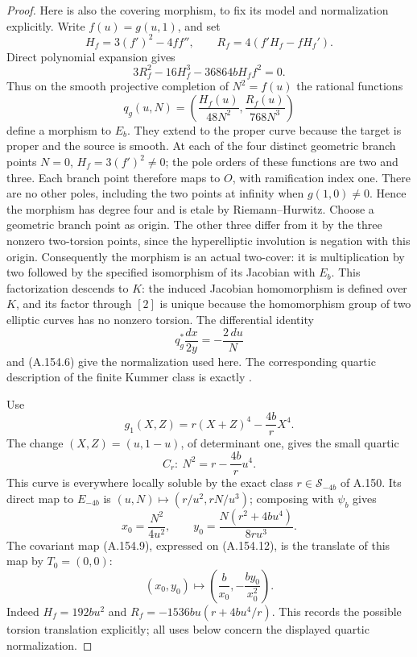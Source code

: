 \begin{proof}
Here is also the covering morphism, to fix its model and
normalization explicitly.  Write \(f(u)=g(u,1)\), and set
\[
 H_f=3(f')^2-4ff'',\qquad
 R_f=4(f'H_f-fH_f').
\tag{A.154.7}
\]
Direct polynomial expansion gives
\[
             3R_f^2-16H_f^3-36864bH_ff^2=0.
\tag{A.154.8}
\]
Thus on the smooth projective completion of \(N^2=f(u)\)
the rational functions
\[
 q_g(u,N)=
       \left(\frac{H_f(u)}{48N^2},
             \frac{R_f(u)}{768N^3}\right)
\tag{A.154.9}
\]
define a morphism to \(E_b\).  They extend to the proper
curve because the target is proper and the source is
smooth.  At each of the four distinct geometric branch
points \(N=0\), \(H_f=3(f')^2\ne0\); the pole orders of
these functions are two and three.  Each branch point
therefore maps to \(O\), with ramification index one.
There are no other poles, including the two points at
infinity when \(g(1,0)\ne0\).  Hence the morphism has
degree four and is etale by Riemann--Hurwitz.
Choose a geometric branch point as origin.  The other
three differ from it by the three nonzero two-torsion
points, since the hyperelliptic involution is negation
with this origin.  Consequently the morphism is an actual
two-cover: it is multiplication by two followed by the
specified isomorphism of its Jacobian with \(E_b\).
This factorization descends to \(K\): the induced Jacobian
homomorphism is defined over \(K\), and its factor through
\([2]\) is unique because the homomorphism group of two
elliptic curves has no nonzero torsion.
The differential identity
\[
                  q_g^*\frac{dx}{2y}=-\frac{2\,du}{N}
\tag{A.154.10}
\]
and (A.154.6) give the normalization used here.
The corresponding quartic description of the finite
Kummer class is exactly
\cite[Lemma 2.1 and Section 2]{AgentFisherBinaryQuartics2022}.

Use
\[
 g_1(X,Z)=r(X+Z)^4-\frac{4b}{r}X^4.
\tag{A.154.11}
\]
The change \((X,Z)=(u,1-u)\), of determinant one, gives
the small quartic
\[
                  C_r:\ N^2=r-\frac{4b}{r}u^4.
\tag{A.154.12}
\]
This curve is everywhere locally soluble by the exact
class \(r\in\mathcal S_{-4b}\) of A.150.  Its direct map
to \(E_{-4b}\) is
\((u,N)\mapsto(r/u^2,rN/u^3)\); composing with \(\psi_b\)
gives
\[
 x_0=\frac{N^2}{4u^2},\qquad
 y_0=\frac{N(r^2+4bu^4)}{8ru^3}.
\tag{A.154.13}
\]
The covariant map (A.154.9), expressed on (A.154.12), is
the translate of this map by \(T_0=(0,0)\):
\[
 (x_0,y_0)\longmapsto
           \left(\frac b{x_0},-\frac{by_0}{x_0^2}\right).
\tag{A.154.14}
\]
Indeed \(H_f=192bu^2\) and
\(R_f=-1536bu(r+4bu^4/r)\).
This records the possible torsion translation explicitly;
all uses below concern the displayed quartic normalization.


\end{proof}
